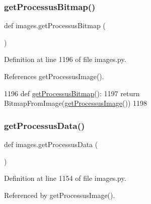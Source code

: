 \subsubsection{\texorpdfstring{get\+Processus\+Bitmap()}{getProcessusBitmap()}}
{\footnotesize\ttfamily def images.\+get\+Processus\+Bitmap (\begin{DoxyParamCaption}{ }\end{DoxyParamCaption})}



Definition at line 1196 of file images.\+py.



References get\+Processus\+Image().


\begin{DoxyCode}
1196 \textcolor{keyword}{def }\hyperlink{namespaceimages_a0b31f0081ba1ffc239df9e1b29d4c02e}{getProcessusBitmap}():
1197     \textcolor{keywordflow}{return} BitmapFromImage(\hyperlink{namespaceimages_a6c329db2429a821439f24528acc6ad29}{getProcessusImage}())
1198 
\end{DoxyCode}
\mbox{\label{namespaceimages_add9d06810f66b7f5621d259a3a02df09}} 
\subsubsection{\texorpdfstring{get\+Processus\+Data()}{getProcessusData()}}
{\footnotesize\ttfamily def images.\+get\+Processus\+Data (\begin{DoxyParamCaption}{ }\end{DoxyParamCaption})}



Definition at line 1154 of file images.\+py.



Referenced by get\+Processus\+Image().


